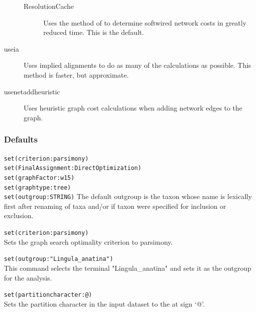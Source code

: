 \begin{description}
\begin{description}
			\item[ResolutionCache] Uses the method of \citep{WheelerandWashburn2023} to 
			determine softwired network costs in greatly reduced time. This is the default.
			
		\end{description}
		

		\item[useia] Uses implied alignments to do as many of the calculations as possible.
		This method is faster, but approximate. 
		
		\item[usenetaddheuristic]	Uses heuristic graph cost calculations when adding network
		edges to the graph.
		
	\end{description}
					
	\subsubsection{Defaults} 
		\texttt{set(criterion:parsimony)}\\
		\texttt{set(FinalAssignment:DirectOptimization)} \\
		\texttt{set(graphFactor:w15)} \\
		\texttt{set(graphtype:tree)}\\
		\texttt{set(outgroup:STRING)} The default outgroup is the taxon whose name is 
		lexically first after renaming of taxa and/or if taxon were specified for inclusion or
		exclusion. 
		
		
	\begin{example}
	
		\item{\texttt{set(criterion:parsimony)}\\Sets the graph search optimality criterion to 
		parsimony.}

		\item{\texttt{set(outgroup:"Lingula\_anatina")}\\This command selects the terminal 
		"Lingula\_anatina" and sets it as the outgroup for the analysis.}
		
		\item{\texttt{set(partitioncharacter:@)}\\Sets the partition character in the input dataset 
		to the at sign `@'.}
		

	\end{example}

